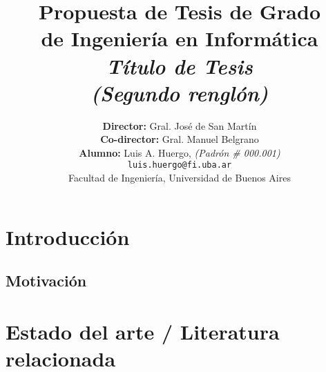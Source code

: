\documentclass[12pt, oneside]{book}
\begin{document}
\begin{titlepage}

    \title{     \textbf{Propuesta de Tesis de Grado \\ de Ingeniería en Informática}\\[2.5ex]
        \textit{Título de Tesis \\(Segundo renglón)} }

    \author{
        \textbf{Director:} Gral. José de San Martín \\[2.5ex]
        \textbf{Co-director:} Gral. Manuel Belgrano \\[2.5ex]
        \textbf{Alumno:} Luis A. Huergo, \textit{(Padrón \# 000.001)}                                \\
        \texttt{ luis.huergo@fi.uba.ar }                                    \\[2.5ex]
        \normalsize{Facultad de Ingeniería, Universidad de Buenos Aires}        \\
    }
    \date{}

\end{titlepage}

\maketitle
\thispagestyle{empty}

\maketitle

{
    \hypersetup{linkcolor=black}
    \tableofcontents
}


\chapter{Introducción}

\section{Motivación}

\bigskip


\chapter{Estado del arte / Literatura relacionada}
\end{document}
